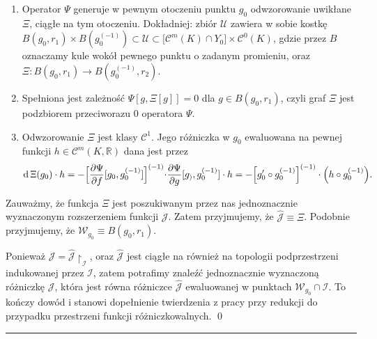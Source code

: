 \begin{enumerate}
	\item{Operator $\Psi$ generuje w pewnym otoczeniu punktu $g_0$ odwzorowanie uwikłane $\Xi$, ciągłe na tym otoczeniu. Dokładniej: zbiór $\mathcal{U}$ zawiera w sobie kostkę $B(g_0, r_1) \times B(g_0^{(-1)}) \subset \mathcal{U} \subset \Big[\mathcal{C}^{m}(K) \cap Y_0 \Big]\times \mathcal{C}^{0}(K)$, gdzie przez $B$ oznaczamy kule wokół pewnego punktu o zadanym promieniu, oraz $\Xi: B(g_0,r_1) \rightarrow B(g_0^{(-1)}, r_2)$. }
	\item{Spełniona jest zależność $\Psi[g, \Xi[g]] = 0$ dla $g \in B(g_0,r_1) $, czyli graf $\Xi$ jest podzbiorem przeciworazu $0$ operatora $\Psi$.}
	\item{Odwzorowanie $\Xi$ jest klasy $\mathcal{C}^1$. Jego różniczka w $g_0$ ewaluowana na pewnej funkcji $h \in \mathcal{C}^{m}(K,\mathbb{R})$ dana jest przez
$$ \mathrm{d}\,\Xi (g_0)\cdot h = - \Bigl[ \frac{\partial \Psi}{\partial f}[g_0,g_0^{(-1)}]\Bigl]^{(-1)}\cdot \frac{\partial \Psi}{\partial g}[g_),g_0^{(-1)}] \cdot h = - \Big[g_0'\circ g_0^{(-1)}\Big]^{(-1)} \cdot \Big( h \circ g_0^{(-1)}\Big).$$	
	}
\end{enumerate}

	Zauważmy, że funkcja $\Xi$ jest poszukiwanym przez nas jednoznacznie wyznaczonym rozszerzeniem funkcji $\mathcal{J}$. Zatem przyjmujemy, że $\hat{\mathcal{J}} \equiv \Xi$. Podobnie przyjmujemy, że $\mathcal{W}_{g_0} \equiv B(g_0, r_1)$.
	
	 Ponieważ $\mathcal{J} = \hat{\mathcal{J}}\restriction_{\mathcal{I}}$, oraz $\hat{\mathcal{J}}$ jest ciągłe na również na topologii podprzestrzeni indukowanej przez $\mathcal{I}$, zatem potrafimy znaleźć jednoznacznie wyznaczoną różniczkę $\mathcal{J}$, która jest równa różniczce $\hat{\mathcal{J}}$ ewaluowanej w punktach $\mathcal{W}_{g_0} \cap \mathcal{I}$. To kończy dowód i stanowi dopełnienie twierdzenia z pracy \citet{Lanza2} przy redukcji do przypadku przestrzeni funkcji różniczkowalnych.
\qed
\newline


\hrule
\begin{dowod}[Nieautonomiczny operator Niemyckiego $\Upsilon: \mathcal{C}^{1}(K) \rightarrow \mathcal{C}^{1}(K)$, $\Upsilon\brackets{m}(x)=\frac{m(x)}{R(x)}$ jest różniczkowalny w normie $|| \circ||_{\mathcal{C}^{1}}$. Różniczka operatora ewaluowana w punkcie $k \in \mathcal{C}^{1}(K)$ dana jest wzorem $ \mathrm{d}\, \Upsilon\brackets{k}\equiv \Upsilon $]\label{proof_nonautonomous_nemytskii2}
\end{dowod}

